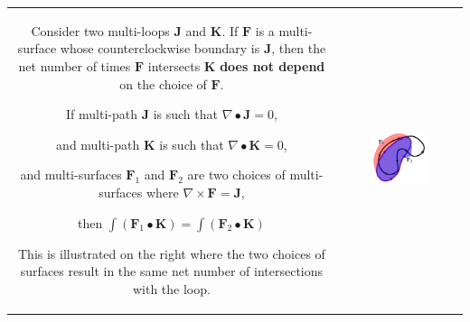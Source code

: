 \begin{tabular}{cc}
\parbox{0.5\textwidth}{
Consider two multi-loops \(\mathbf{J}\) and \(\mathbf{K}\). If \(\mathbf{F}\) is a multi-surface whose counterclockwise boundary is \(\mathbf{J}\), then the net number of times \(\mathbf{F}\) intersects \(\mathbf{K}\) {\bf does not depend} on the choice of \(\mathbf{F}\). 

\begin{thm}\label{thm:different_surfaces_same_result}
If multi-path \(\mathbf{J}\) is such that \(\nabla \bullet \mathbf{J} = 0\), 

and multi-path \(\mathbf{K}\) is such that \(\nabla \bullet \mathbf{K} = 0\),

and multi-surfaces \(\mathbf{F}_1\) and \(\mathbf{F}_2\) are two choices
of multi-surfaces where \(\nabla \times \mathbf{F} = \mathbf{J}\), 

then \(\int (\mathbf{F}_1 \bullet \mathbf{K}) = \int (\mathbf{F}_2 \bullet \mathbf{K})\)
\end{thm}

This is illustrated on the right where the two choices of surfaces result in the same net number of intersections with the loop.
} & \parbox{0.5\textwidth}{
\includegraphics[width = 0.5\textwidth]{Intersections/Path-surface_intersections/closed_path_and_different_surfaces}
}
\end{tabular}